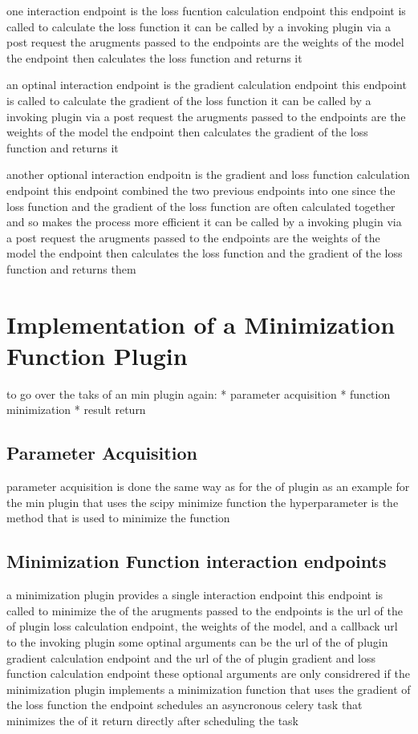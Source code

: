 \documentclass[
  a4paper,  %
  twoside,  %
  bibliography=totoc,
  headsepline,
  cleardoublepage=empty,
  parskip=half,
  draft=false
]{scrbook}
\begin{document}
one interaction endpoint is the loss fucntion calculation endpoint
this endpoint is called to calculate the loss function
it can be called by a invoking plugin via a post request
the arugments passed to the endpoints are the weights of the model
the endpoint then calculates the loss function and returns it

an optinal interaction endpoint is the gradient calculation endpoint
this endpoint is called to calculate the gradient of the loss function
it can be called by a invoking plugin via a post request
the arugments passed to the endpoints are the weights of the model
the endpoint then calculates the gradient of the loss function and returns it

another optional interaction endpoitn is the gradient and loss function calculation endpoint
this endpoint combined the two previous endpoints into one since the loss function and the gradient of the loss function are often calculated together and so makes the process more efficient
it can be called by a invoking plugin via a post request
the arugments passed to the endpoints are the weights of the model
the endpoint then calculates the loss function and the gradient of the loss function and returns them


\section{Implementation of a Minimization Function Plugin}
\label{sec:implementationOfAMinimizationFunctionPlugin}
to go over the taks of an min plugin again:
* parameter acquisition
* function minimization
* result return

\subsection{Parameter Acquisition}
\label{subsec:parameterAcquisition}
parameter acquisition is done the same way as for the of plugin
as an example for the min plugin that uses the scipy minimize function the hyperparameter is the method that is used to minimize the function

\subsection{Minimization Function interaction endpoints}
\label{subsec:minimizationFunctionInteractionEndpoints}

a minimization plugin provides a single interaction endpoint
this endpoint is called to minimize the of
the arugments passed to the endpoints is the url of the of plugin loss calculation endpoint, the weights of the model, and a callback url to the invoking plugin
some optinal arguments can be the url of the of plugin gradient calculation endpoint and the url of the of plugin gradient and loss function calculation endpoint
these optional arguments are only considrered if the minimization plugin implements a minimization function that uses the gradient of the loss function
the endpoint schedules an asyncronous celery task that minimizes the of
it return directly after scheduling the task
\end{document}
